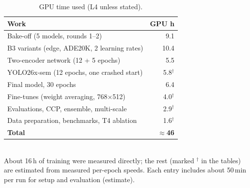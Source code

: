 \documentclass[conference,a4paper]{IEEEtran}
\newcommand{\est}{$^{\dagger}$}
\begin{document}
\begin{table}[!htbp]\centering\footnotesize
\caption{GPU time used (L4 unless stated).}\label{tab:gpu}
\begin{tabularx}{\columnwidth}{@{}Lr@{}}
\toprule
\textbf{Work} & \textbf{GPU h}\\
\midrule
Bake-off (5 models, rounds 1--2) & 9.1\\
B3 variants (edge, ADE20K, 2 learning rates) & 10.4\\
Two-encoder network (12 + 5 epochs) & 5.5\\
YOLO26x-sem (12 epochs, one crashed start) & 5.8\est\\
Final model, 30 epochs & 6.4\\
Fine-tunes (weight averaging, 768$\times$512) & 4.0\est\\
Evaluations, CCP, ensemble, multi-scale & 2.9\est\\
Data preparation, benchmarks, T4 ablation & 1.6\est\\
\midrule
\textbf{Total} & \textbf{$\approx$46}\\
\bottomrule
\end{tabularx}
\\[1pt]{\scriptsize About 16\,h of training were measured directly; the rest (marked \est{} in the tables) are estimated from measured per-epoch speeds. Each entry includes about 50\,min per run for setup and evaluation (estimate).}
\end{table}
\end{document}
